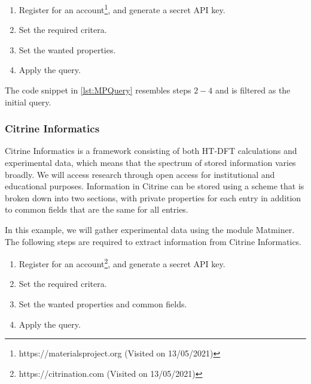 \begin{enumerate}
  \item Register for an account\footnote{https://materialsproject.org (Visited on 13/05/2021)}, and generate a secret API key.
  \item Set the required critera.
  \item Set the wanted properties.
  \item Apply the query.
\end{enumerate}

The code snippet in \autoref{lst:MPQuery} resembles steps $2-4$ and is filtered as the initial query. %

\subsubsection{Citrine Informatics}

Citrine Informatics is a framework consisting of both HT-DFT calculations and experimental data, which means that the spectrum of stored information varies broadly. We will access research through open access for institutional and educational purposes. Information in Citrine can be stored using a scheme that is broken down into two sections, with private properties for each entry in addition to common fields that are the same for all entries.%

In this example, we will gather experimental data using the module Matminer. The following steps are required to extract information from Citrine Informatics.

\begin{enumerate}
  \item Register for an account\footnote{https://citrination.com (Visited on 13/05/2021)}, and generate a secret API key.
  \item Set the required critera.
  \item Set the wanted properties and common fields.
  \item Apply the query.
\end{enumerate}

